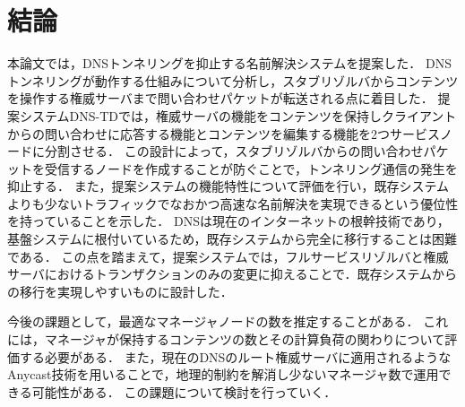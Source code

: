\section{結論}
本論文では，DNSトンネリングを抑止する名前解決システムを提案した．
DNSトンネリングが動作する仕組みについて分析し，スタブリゾルバからコンテンツを操作する権威サーバまで問い合わせパケットが転送される点に着目した．
提案システムDNS-TDでは，権威サーバの機能をコンテンツを保持しクライアントからの問い合わせに応答する機能とコンテンツを編集する機能を2つサービスノードに分割させる．
この設計によって，スタブリゾルバからの問い合わせパケットを受信するノードを作成することが防ぐことで，トンネリング通信の発生を抑止する．
また，提案システムの機能特性について評価を行い，既存システムよりも少ないトラフィックでなおかつ高速な名前解決を実現できるという優位性を持っていることを示した．
DNSは現在のインターネットの根幹技術であり，基盤システムに根付いているため，既存システムから完全に移行することは困難である．
この点を踏まえて，提案システムでは，フルサービスリゾルバと権威サーバにおけるトランザクションのみの変更に抑えることで．既存システムからの移行を実現しやすいものに設計した．

今後の課題として，最適なマネージャノードの数を推定することがある．
これには，マネージャが保持するコンテンツの数とその計算負荷の関わりについて評価する必要がある．
また，現在のDNSのルート権威サーバに適用されるようなAnycast技術を用いることで，地理的制約を解消し少ないマネージャ数で運用できる可能性がある．
この課題について検討を行っていく．
